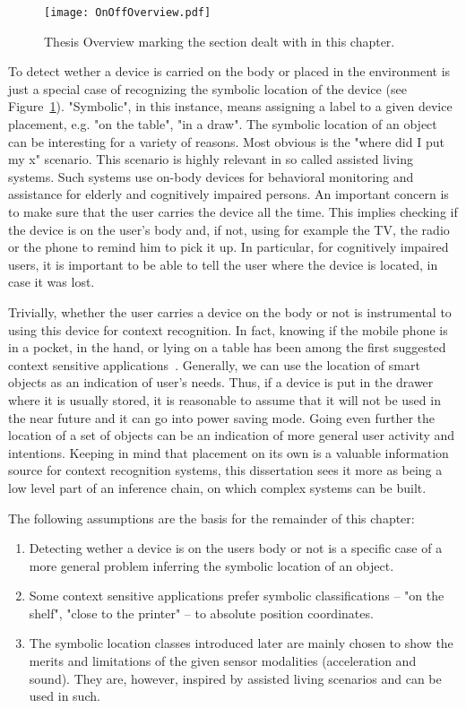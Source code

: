 \begin{figure}[t]
  \begin{center}
  \texttt{[image: OnOffOverview.pdf]}
	\end{center}
\caption[Chapter content in relation to the thesis overview]{Thesis Overview marking the section dealt with in this
 chapter.} \label{fig:OnOffOverview} \end{figure} 
 To detect wether a device is carried on the body or placed in the environment is
 just a special case of recognizing the symbolic location of the
 device (see Figure~\ref{fig:OnOffOverview}). "Symbolic", in this instance, means assigning a label to a
 given device placement, e.g. "on the table", "in a draw". The
 symbolic location of an object can be interesting for a variety of
 reasons. Most obvious is the "where did I put my x" scenario. This
 scenario is highly relevant in so called assisted living
 systems. Such systems use on-body devices for behavioral monitoring
 and assistance for elderly and cognitively impaired persons. An
 important concern is to make sure that the user carries the device
 all the time. This implies checking if the device is on the user's body
 and, if not, using for example the TV, the radio or the phone to
 remind him to pick it up. In particular, for cognitively impaired
 users, it is important to be able to tell the user where the
 device is located, in case it was lost.

Trivially, whether the user carries a device on the body or not is
instrumental to using this device for context recognition. In fact,
knowing if the mobile phone is in a pocket, in the hand, or lying on a
table has been among the first suggested context sensitive
applications~\cite{schmidt1999aic}.
 Generally, we can use the location of smart objects as an indication 
 of user's needs. Thus, if a
device is put in the drawer where it is usually stored, it is
reasonable to assume that it will not be used in the near future and
it can go into power saving mode. Going even further the location of
a set of objects can be an indication of more general user activity
and intentions. Keeping in mind that placement on its own is a
valuable information source for context recognition systems, this
dissertation sees it more as being a low level part of an inference
chain, on which complex systems can be built.


The following assumptions are the basis for the remainder of this
chapter: \begin{enumerate}
\item Detecting wether a device is on the users body or not is a specific
 case of a more general problem inferring the symbolic location of an
 object.
\item Some context sensitive applications prefer symbolic
 classifications -- "on the shelf", "close to the printer" -- to absolute
 position coordinates.
\item The symbolic location classes introduced later are mainly chosen
 to show the merits and limitations of the given sensor modalities
 (acceleration and sound). They are, however, inspired by assisted
 living scenarios and can be used in such.
\end{enumerate}

